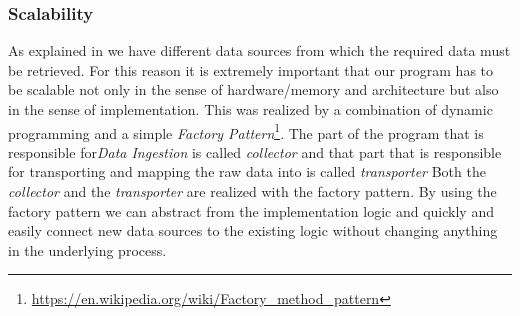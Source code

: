 \subsubsection{Scalability}
\label{subsubsec:scale}
As explained in  we have different data sources from which the required data must be retrieved.
For this reason it is extremely important that our program has to be scalable not only in the sense of hardware/memory and architecture but also in the sense of implementation.
\newline
This was realized by a combination of dynamic programming and a simple \textit{Factory Pattern}\footnote{\url{https://en.wikipedia.org/wiki/Factory_method_pattern}}.
\newline
The part of the program that is responsible for\textit{Data Ingestion} is called \textit{collector}
and that part that is responsible for transporting and mapping the raw data into \pg{} is called \textit{transporter}
\newline
Both the \textit{collector} and the \textit{transporter} are realized with the factory pattern.
By using the factory pattern we can abstract from the implementation logic and quickly and easily connect new data sources to the existing logic without changing anything in the underlying process.
%
